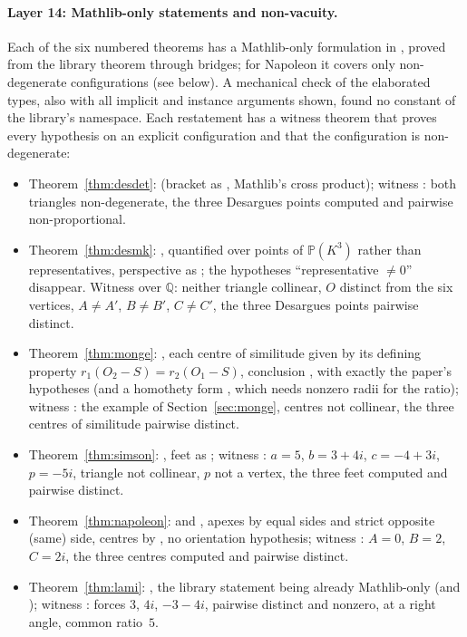 \documentclass[11pt]{article}
\theoremstyle{definition}
\theoremstyle{remark}
\newcommand{\QQ}{\mathbb{Q}}
\newcommand{\PP}{\mathbb{P}}
\begin{document}
\paragraph{Layer 14: Mathlib-only statements and non-vacuity.} Each of the six numbered theorems has a
Mathlib-only formulation in , proved from the library theorem through bridges; for
Napoleon it covers only non-degenerate configurations (see below). A mechanical check of the elaborated types, also with all implicit and instance arguments
shown, found no constant of the library's namespace. Each restatement has a witness theorem that
proves every hypothesis on an explicit configuration and that the configuration is non-degenerate:
\begin{itemize}
\item Theorem~\ref{thm:desdet}:  (bracket as ,
Mathlib's cross product); witness : both triangles
non-degenerate, the three Desargues points computed and pairwise non-proportional.
\item Theorem~\ref{thm:desmk}: , quantified over points of
$\PP(K^3)$ rather than representatives, perspective as ; the
hypotheses ``representative $\ne0$'' disappear. Witness  over $\QQ$:
neither triangle collinear, $O$ distinct from the six vertices, $A\ne A'$, $B\ne B'$, $C\ne C'$, the
three Desargues points pairwise distinct.
\item Theorem~\ref{thm:monge}: , each centre of similitude given by its defining
property $r_1(O_2-S)=r_2(O_1-S)$, conclusion , with exactly the paper's hypotheses
(and a homothety form , which needs nonzero radii for the ratio);
witness : the example of Section~\ref{sec:monge}, centres not collinear,
the three centres of similitude pairwise distinct.
\item Theorem~\ref{thm:simson}: , feet as
; witness : $a=5$, $b=3+4i$,
$c=-4+3i$, $p=-5i$, triangle not collinear, $p$ not a vertex, the three feet computed and pairwise
distinct.
\item Theorem~\ref{thm:napoleon}:  and
, apexes by equal sides and strict opposite (same) side, centres
by , no orientation hypothesis; witness :
$A=0$, $B=2$, $C=2i$, the three centres computed and pairwise distinct.
\item Theorem~\ref{thm:lami}: , the library statement being already Mathlib-only
(and ); witness : forces $3$, $4i$, $-3-4i$,
pairwise distinct and nonzero, at a right angle, common ratio~$5$.
\end{itemize}
\end{document}
